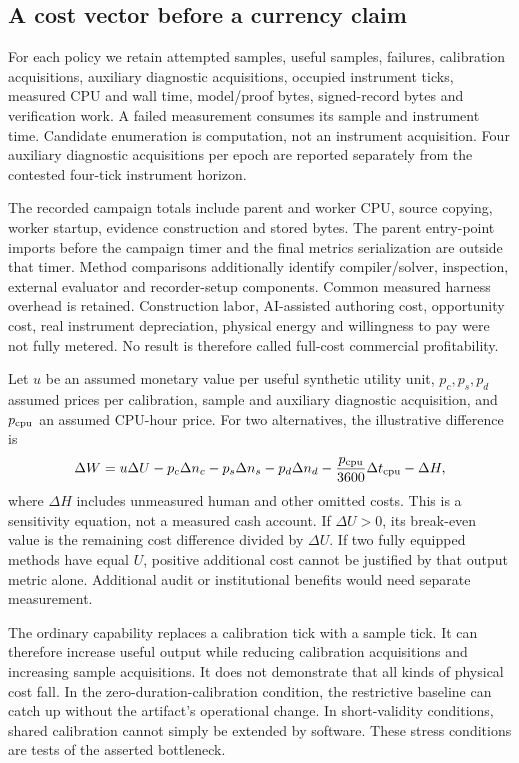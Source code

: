 \subsection{A cost vector before a currency claim}
For each policy we retain attempted samples, useful samples, failures, calibration acquisitions, auxiliary diagnostic acquisitions, occupied instrument ticks, measured CPU and wall time, model/proof bytes, signed-record bytes and verification work. A failed measurement consumes its sample and instrument time. Candidate enumeration is computation, not an instrument acquisition. Four auxiliary diagnostic acquisitions per epoch are reported separately from the contested four-tick instrument horizon.

The recorded campaign totals include parent and worker CPU, source copying, worker startup, evidence construction and stored bytes. The parent entry-point imports before the campaign timer and the final metrics serialization are outside that timer. Method comparisons additionally identify compiler/solver, inspection, external evaluator and recorder-setup components. Common measured harness overhead is retained. Construction labor, AI-assisted authoring cost, opportunity cost, real instrument depreciation, physical energy and willingness to pay were not fully metered. No result is therefore called full-cost commercial profitability.

\CostTable

\AdditionalCosts

Let $u$ be an assumed monetary value per useful synthetic utility unit, $p_c,p_s,p_d$ assumed prices per calibration, sample and auxiliary diagnostic acquisition, and $p_{\rm cpu}$ an assumed CPU-hour price. For two alternatives, the illustrative difference is
\begin{equation}
\Delta W=u\Delta U-p_c\Delta n_c-p_s\Delta n_s-p_d\Delta n_d
-\frac{p_{\rm cpu}}{3600}\Delta t_{\rm cpu}-\Delta H,
\end{equation}
where $\Delta H$ includes unmeasured human and other omitted costs. This is a sensitivity equation, not a measured cash account. If $\Delta U>0$, its break-even value is the remaining cost difference divided by $\Delta U$. If two fully equipped methods have equal $U$, positive additional cost cannot be justified by that output metric alone. Additional audit or institutional benefits would need separate measurement.

The ordinary capability replaces a calibration tick with a sample tick. It can therefore increase useful output while reducing calibration acquisitions and increasing sample acquisitions. It does not demonstrate that all kinds of physical cost fall. In the zero-duration-calibration condition, the restrictive baseline can catch up without the artifact's operational change. In short-validity conditions, shared calibration cannot simply be extended by software. These stress conditions are tests of the asserted bottleneck.

